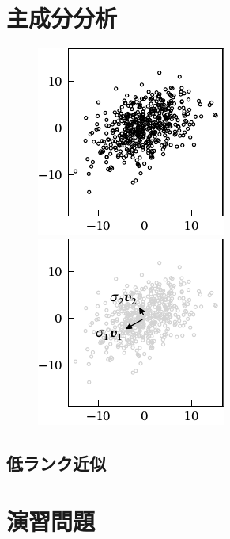 \documentclass[../../main]{subfiles}
\begin{document}
\section{主成分分析}
\begin{figure}[htbp]
  \begin{minipage}{\linewidth/2}
    \centering
    \includegraphics{scatter.pdf}
  \end{minipage}%
  \begin{minipage}{\linewidth/2}
    \centering
    \includegraphics{pca.pdf}
  \end{minipage}
\end{figure}

\begin{subappendices}
\section{低ランク近似}
\end{subappendices}

\section*{演習問題}
\end{document}
